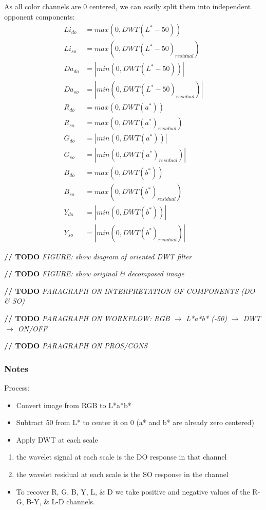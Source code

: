 \documentclass[journal,onecolumn]{IEEEtran}
\begin{document}
As all color channels are $0$ centered, we can easily split them into independent opponent components:
\begin{align}
    Li_{do} &=   max(0, DWT(L^*-50))              \\
    Li_{so} &=   max(0, DWT(L^*-50)_{residual})   \\
    Da_{do} &= | min(0, DWT(L^*-50)) |            \\
    Da_{so} &= | min(0, DWT(L^*-50)_{residual}) | \\
    R_{do}  &=   max(0, DWT(a^*))              \\
    R_{so}  &=   max(0, DWT(a^*)_{residual})   \\
    G_{do}  &= | min(0, DWT(a^*)) |            \\
    G_{so}  &= | min(0, DWT(a^*)_{residual}) | \\
    B_{do}  &=   max(0, DWT(b^*))              \\
    B_{so}  &=   max(0, DWT(b^*)_{residual})   \\
    Y_{do}  &= | min(0, DWT(b^*)) |            \\
    Y_{so}  &= | min(0, DWT(b^*)_{residual}) |
\end{align}



\textbf{// TODO} \textit{FIGURE: show diagram of oriented DWT filter}

\textbf{// TODO} \textit{FIGURE: show original \& decomposed image}

\textbf{// TODO} \textit{PARAGRAPH ON INTERPRETATION OF COMPONENTS (DO \& SO)}

\textbf{// TODO} \textit{PARAGRAPH ON WORKFLOW: RGB $\rightarrow$ L*a*b* (-50) $\rightarrow$ DWT $\rightarrow$ ON/OFF}

\textbf{// TODO} \textit{PARAGRAPH ON PROS/CONS}

\subsubsection{Notes}

Process:
\begin{itemize}
    \item Convert image from RGB to L*a*b*
    \item Subtract 50 from L* to center it on 0 (a* and b* are already zero centered)
    \item Apply DWT at each scale
\end{itemize}
\begin{enumerate}
    \item the wavelet signal at each scale is the DO response in that channel
    \item the wavelet residual at each scale is the SO response in the channel
\end{enumerate}
\begin{itemize}
    \item To recover R, G, B, Y, L, \& D we take positive and negative values of the R-G, B-Y, \& L-D channels.
\end{itemize}
\end{document}
